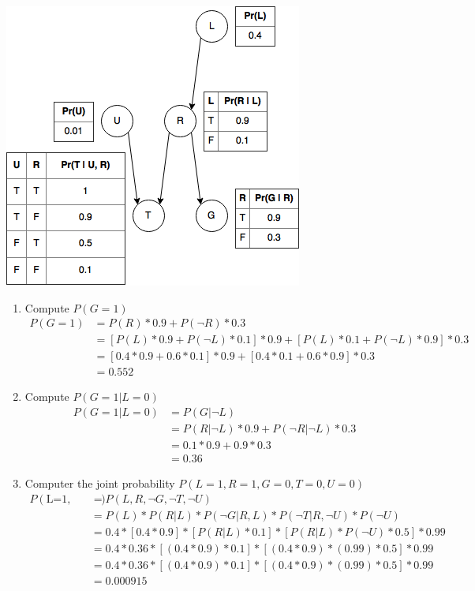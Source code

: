 \documentclass[titlepage]{article}
\begin{document}
\centerline{\includegraphics[scale=0.7]{7params.png}}
\begin{enumerate}[label=(\alph*)]
	\item Compute $P(G=1)$\\
		\begin{equation*}
		\begin{aligned}
			P(G=1) &= P(R)*0.9+P(\neg R)*0.3\\
				   &= [P(L) * 0.9 + P(\neg L) * 0.1] * 0.9 + [P(L) * 0.1 + P(\neg L) * 0.9] * 0.3\\
				   &= [0.4 * 0.9 + 0.6 * 0.1] * 0.9 + [0.4 * 0.1 + 0.6 * 0.9] * 0.3\\
				   &= 0.552
		\end{aligned}
		\end{equation*}
	\item Compute $P(G=1|L=0)$\\
		\begin{equation*}
		\begin{aligned}
			P(G=1|L=0) &= P(G | \neg L)\\
					   &= P(R|\neg L)*0.9+P(\neg R|\neg L)*0.3\\
					   &= 0.1 * 0.9 + 0.9 * 0.3\\
					   &= 0.36
		\end{aligned}
		\end{equation*}
	\item Computer the joint probability $P(L=1,R=1,G=0,T=0,U=0)$\\
	\begin{equation*}
	\begin{aligned}
		P(\text{L=1, R=1, G=0, T=0, U=0}) &= P(L, R, \neg G, \neg T, \neg U)\\
										  &= P(L) * P(R|L) * P(\neg G | R,L) * P(\neg T | R, \neg U) * P(\neg U)\\
		 								  &= 0.4 * [0.4 * 0.9] * [P(R|L) * 0.1] * [P(R|L) * P(\neg U) * 0.5] * 0.99\\
		 								  &= 0.4 * 0.36 * [(0.4 * 0.9) * 0.1] * [(0.4 * 0.9) * (0.99) * 0.5] * 0.99\\
		 								  &= 0.4 * 0.36 * [(0.4 * 0.9) * 0.1] * [(0.4 * 0.9) * (0.99) * 0.5] * 0.99\\
		 								  &= 0.000915
	\end{aligned}
	\end{equation*}
\end{enumerate}
\end{document}
